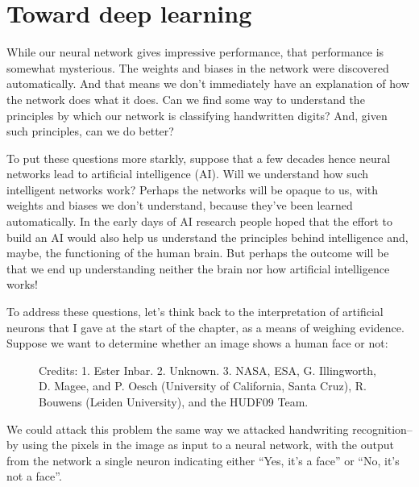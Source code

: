 \documentclass[a4paper,twoside,10pt]{book}
\begin{document}
\section{Toward deep learning}
While our neural network gives impressive performance, that performance is somewhat mysterious. The weights and biases in the network were discovered automatically. And that means we don't immediately have an explanation of how the network does what it does. Can we find some way to understand the principles by which our network is classifying handwritten digits? And, given such principles, can we do better?

To put these questions more starkly, suppose that a few decades hence neural networks lead to artificial intelligence (AI). Will we understand how such intelligent networks work? Perhaps the networks will be opaque to us, with weights and biases we don't understand, because they've been learned automatically. In the early days of AI research people hoped that the effort to build an AI would also help us understand the principles behind intelligence and, maybe, the functioning of the human brain. But perhaps the outcome will be that we end up understanding neither the brain nor how artificial intelligence works!

To address these questions, let's think back to the interpretation of artificial neurons that I gave at the start of the chapter, as a means of weighing evidence. Suppose we want to determine whether an image shows a human face or not:

\begin{figure}
	\caption{Credits: 1. Ester Inbar. 2. Unknown. 3. NASA, ESA, G. Illingworth, D. Magee, and P. Oesch (University of California, Santa Cruz), R. Bouwens (Leiden University), and the HUDF09 Team.}
\end{figure}
We could attack this problem the same way we attacked handwriting recognition--by using the pixels in the image as input to a neural network, with the output from the network a single neuron indicating either ``Yes, it's a face'' or ``No, it's not a face''.
\end{document}
